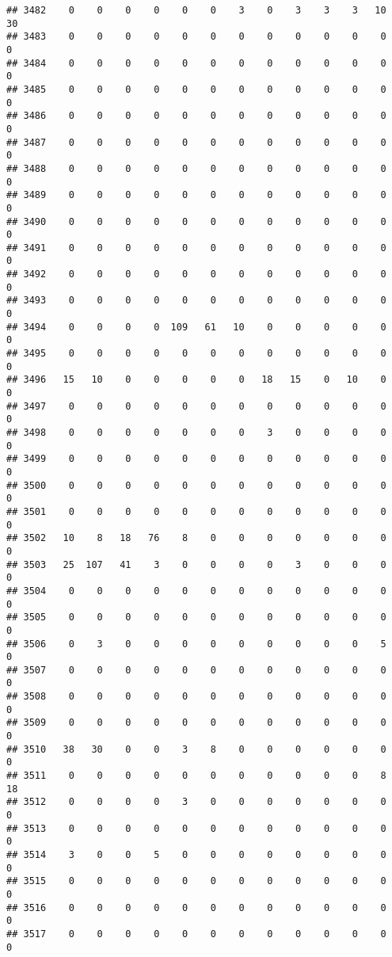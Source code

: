 \documentclass[]{article}
\begin{document}
\begin{verbatim}
## 3482    0    0    0    0    0    0    3    0    3    3    3   10   30
## 3483    0    0    0    0    0    0    0    0    0    0    0    0    0
## 3484    0    0    0    0    0    0    0    0    0    0    0    0    0
## 3485    0    0    0    0    0    0    0    0    0    0    0    0    0
## 3486    0    0    0    0    0    0    0    0    0    0    0    0    0
## 3487    0    0    0    0    0    0    0    0    0    0    0    0    0
## 3488    0    0    0    0    0    0    0    0    0    0    0    0    0
## 3489    0    0    0    0    0    0    0    0    0    0    0    0    0
## 3490    0    0    0    0    0    0    0    0    0    0    0    0    0
## 3491    0    0    0    0    0    0    0    0    0    0    0    0    0
## 3492    0    0    0    0    0    0    0    0    0    0    0    0    0
## 3493    0    0    0    0    0    0    0    0    0    0    0    0    0
## 3494    0    0    0    0  109   61   10    0    0    0    0    0    0
## 3495    0    0    0    0    0    0    0    0    0    0    0    0    0
## 3496   15   10    0    0    0    0    0   18   15    0   10    0    0
## 3497    0    0    0    0    0    0    0    0    0    0    0    0    0
## 3498    0    0    0    0    0    0    0    3    0    0    0    0    0
## 3499    0    0    0    0    0    0    0    0    0    0    0    0    0
## 3500    0    0    0    0    0    0    0    0    0    0    0    0    0
## 3501    0    0    0    0    0    0    0    0    0    0    0    0    0
## 3502   10    8   18   76    8    0    0    0    0    0    0    0    0
## 3503   25  107   41    3    0    0    0    0    3    0    0    0    0
## 3504    0    0    0    0    0    0    0    0    0    0    0    0    0
## 3505    0    0    0    0    0    0    0    0    0    0    0    0    0
## 3506    0    3    0    0    0    0    0    0    0    0    0    5    0
## 3507    0    0    0    0    0    0    0    0    0    0    0    0    0
## 3508    0    0    0    0    0    0    0    0    0    0    0    0    0
## 3509    0    0    0    0    0    0    0    0    0    0    0    0    0
## 3510   38   30    0    0    3    8    0    0    0    0    0    0    0
## 3511    0    0    0    0    0    0    0    0    0    0    0    8   18
## 3512    0    0    0    0    3    0    0    0    0    0    0    0    0
## 3513    0    0    0    0    0    0    0    0    0    0    0    0    0
## 3514    3    0    0    5    0    0    0    0    0    0    0    0    0
## 3515    0    0    0    0    0    0    0    0    0    0    0    0    0
## 3516    0    0    0    0    0    0    0    0    0    0    0    0    0
## 3517    0    0    0    0    0    0    0    0    0    0    0    0    0

\end{verbatim}
\end{document}
